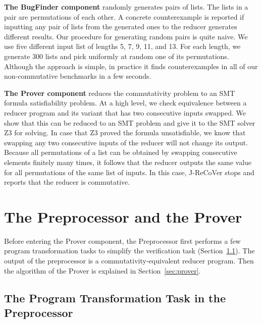 \documentclass{llncs}
\begin{document}
\textbf{The BugFinder component} randomly generates pairs of lists. The lists in a pair are permutations of each other. A concrete counterexample is reported if inputting any pair of lists from the generated ones to the reducer generates different results.
Our procedure for generating random pairs is quite naive. We use five different input list of lengths 5, 7, 9, 11, and 13. For each length, we generate 300 lists and pick uniformly at random one of its permutations. Although the approach is simple, in practice it finds counterexamples in all of our non-commutative benchmarks in a few seconds. 

\textbf{The Prover component} reduces the commutativity problem to an SMT formula satisfiability problem. At a high level, we check equivalence between a reducer program and its variant that has two consecutive inputs swapped. We show that this can be reduced to an SMT problem and give it to the SMT solver Z3 for solving. In case that Z3 proved the formula unsatisfiable, we know that swapping any two consecutive inputs of the reducer will not change its output. Because all permutations of a list can be obtained by swapping consecutive elements finitely many times, it follows that the reducer outputs the same value for all permutations of the same list of inputs.
In this case,  J-ReCoVer stops and reports that the reducer is commutative.




\section{The Preprocessor and the Prover} \label{sec:preprocessor_prover}

Before entering the Prover component, the Preprocessor first performs a few program transformation tasks to simplify the verification task (Section~\ref{sec:program_trans1}). The output of the preprocessor is a commutativity-equivalent reducer program.  Then the algorithm of the Prover is explained in Section~\ref{sec:prover}. 

\subsection{The Program Transformation Task in the Preprocessor}
\label{sec:program_trans1}
\end{document}
